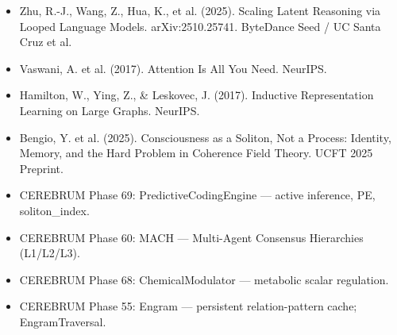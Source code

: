 \begin{itemize}
  \item [zhu2025loooplm] Zhu, R.-J., Wang, Z., Hua, K., et al. (2025). Scaling Latent Reasoning via Looped Language Models. arXiv:2510.25741. ByteDance Seed / UC Santa Cruz et al.
  \item [vaswani2017attention] Vaswani, A. et al. (2017). Attention Is All You Need. NeurIPS.
  \item [hamilton2017graphsage] Hamilton, W., Ying, Z., \& Leskovec, J. (2017). Inductive Representation Learning on Large Graphs. NeurIPS.
  \item [bengio2025soliton] Bengio, Y. et al. (2025). Consciousness as a Soliton, Not a Process: Identity, Memory, and the Hard Problem in Coherence Field Theory. UCFT 2025 Preprint.
  \item [Phase 69] CEREBRUM Phase 69: PredictiveCodingEngine --- active inference, PE, soliton_index.
  \item [Phase 60] CEREBRUM Phase 60: MACH --- Multi-Agent Consensus Hierarchies (L1/L2/L3).
  \item [Phase 68] CEREBRUM Phase 68: ChemicalModulator --- metabolic scalar regulation.
  \item [Phase 55] CEREBRUM Phase 55: Engram --- persistent relation-pattern cache; EngramTraversal.
\end{itemize}
